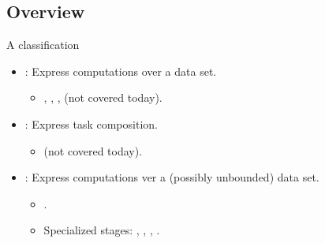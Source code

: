 \subsection{Overview}

\begin{frame}[t]{A classification}
\begin{itemize}
  \item {}: Express computations over a data set.
    \begin{itemize}
      \item {}, , ,  (not covered today).
    \end{itemize}

  \vfill\pause
  \item {}: Express task composition.
    \begin{itemize}
      \item {} (not covered today).
    \end{itemize}

  \vfill\pause
  \item {}: Express computations ver a (possibly unbounded) data set.
    \begin{itemize}
      \item {}.
      \item Specialized stages: , , 
            , .
    \end{itemize}
\end{itemize}
\end{frame}
